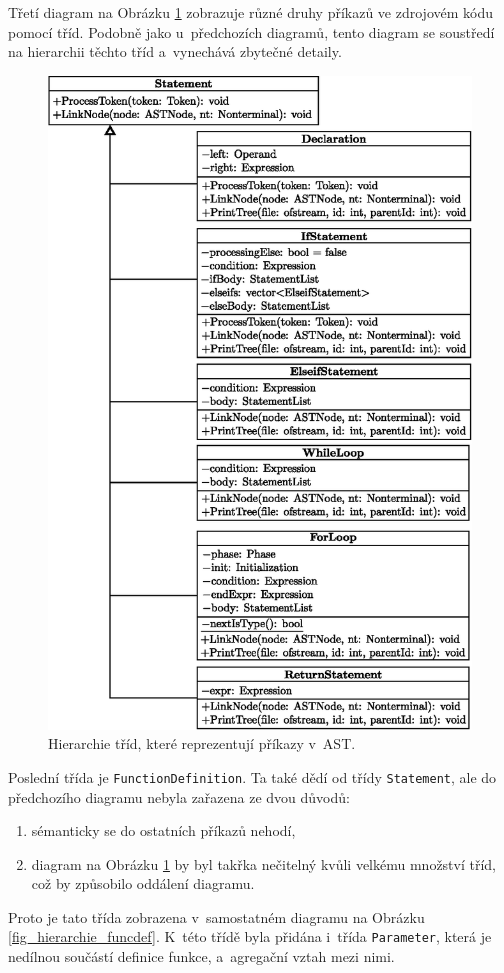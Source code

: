 Třetí diagram na Obrázku \ref{fig_hierarchie_statement} zobrazuje různé druhy příkazů ve zdrojovém kódu pomocí tříd.
Podobně jako u~předchozích diagramů, tento diagram se soustředí na hierarchii těchto tříd a~vynechává zbytečné detaily.
\begin{figure}[h!]
		\centering
		\includegraphics[height=0.88\textheight]{obrazky-figures/statement_hierarchy.eps}
		\caption{Hierarchie tříd, které reprezentují příkazy v~AST.}
		\label{fig_hierarchie_statement}
\end{figure}

\newpage

Poslední třída je \texttt{FunctionDefinition}.
Ta také dědí od třídy \texttt{Statement}, ale do předchozího diagramu nebyla zařazena ze dvou důvodů:
\begin{enumerate}
	\item sémanticky se do ostatních příkazů nehodí,
	\item diagram na Obrázku \ref{fig_hierarchie_statement} by byl takřka nečitelný kvůli velkému množství tříd, což by způsobilo oddálení diagramu.
\end{enumerate}
Proto je tato třída zobrazena v~samostatném diagramu na Obrázku \ref{fig_hierarchie_funcdef}.
K~této třídě byla přidána i~třída \texttt{Parameter}, která je nedílnou součástí definice funkce, a~agregační vztah mezi nimi.

